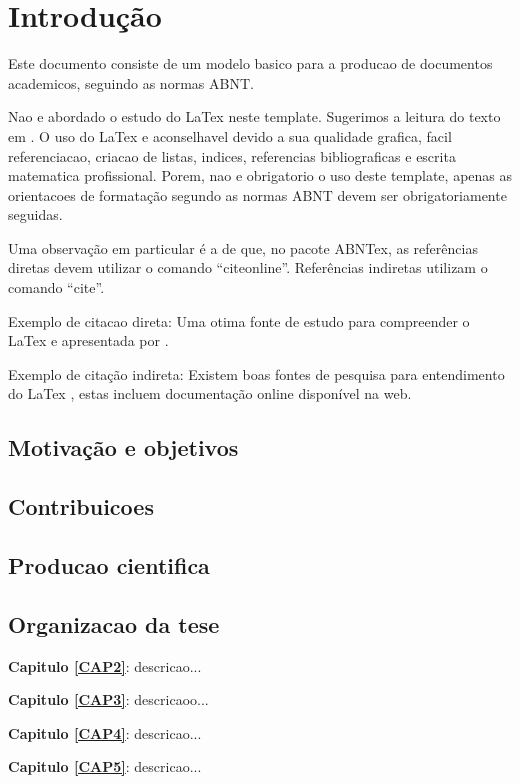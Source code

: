 \chapter{Introdução}\label{CAP:introducao}

Este documento consiste de um modelo basico para a producao de documentos academicos, seguindo as normas ABNT. 

Nao e abordado o estudo do LaTex neste template. Sugerimos a leitura do texto em . O uso do LaTex e aconselhavel devido a sua qualidade grafica, facil referenciacao, criacao de listas, indices, referencias bibliograficas e escrita matematica profissional. Porem, nao e obrigatorio o uso deste template, apenas as orientacoes de formatação segundo as normas ABNT devem ser obrigatoriamente seguidas.

Uma observação em particular é a de que, no pacote ABNTex, as referências diretas devem utilizar o comando ``citeonline''. Referências indiretas utilizam o comando ``cite''.

Exemplo de citacao direta: Uma otima fonte de estudo para compreender o LaTex e apresentada por . 

Exemplo de citação indireta: Existem boas fontes de pesquisa para entendimento do LaTex \cite{Oetiker:1995}, estas incluem documentação online disponível na web.

\section{Motivação e objetivos}


 
\section{Contribuicoes}




\section{Producao cientifica}


\section{Organizacao da tese}

\noindent \textbf{Capitulo \ref{CAP2}}: descricao...

\noindent \textbf{Capitulo \ref{CAP3}}: descricaoo...

\noindent \textbf{Capitulo \ref{CAP4}}: descricao...

\noindent \textbf{Capitulo \ref{CAP5}}: descricao...